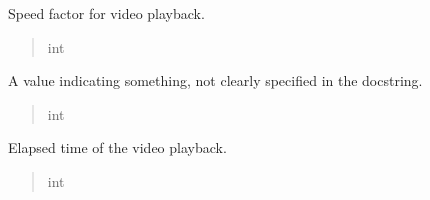 \documentclass[letterpaper,10pt,english]{sphinxmanual}
\begin{document}
\begin{fulllineitems}
\begin{fulllineitems}
\begin{quote}
\begin{description}
\end{description}\end{quote}

\end{fulllineitems}


\begin{fulllineitems}
\label{\detokenize{general_interface:general_interface.LecteurVideo.vitesse_lecture}}
\pysigstartsignatures
{}
\pysigstopsignatures
\sphinxAtStartPar
Speed factor for video playback.
\begin{quote}\begin{description}
\sphinxAtStartPar
int

\end{description}\end{quote}

\end{fulllineitems}


\begin{fulllineitems}
\label{\detokenize{general_interface:general_interface.LecteurVideo.valeur}}
\pysigstartsignatures
{}
\pysigstopsignatures
\sphinxAtStartPar
A value indicating something, not clearly specified in the docstring.
\begin{quote}\begin{description}
\sphinxAtStartPar
int

\end{description}\end{quote}

\end{fulllineitems}


\begin{fulllineitems}
\label{\detokenize{general_interface:general_interface.LecteurVideo.temps_ecoule}}
\pysigstartsignatures
{}
\pysigstopsignatures
\sphinxAtStartPar
Elapsed time of the video playback.
\begin{quote}\begin{description}
\sphinxAtStartPar
int


\end{description}
\end{quote}
\end{fulllineitems}
\end{fulllineitems}
\end{document}
